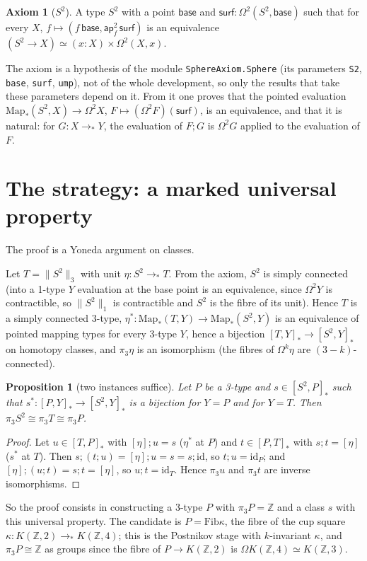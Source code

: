 \documentclass[11pt]{amsart}
\newtheorem{proposition}[theorem]{Proposition}
\theoremstyle{definition}
\newtheorem{axiom}[theorem]{Axiom}
\theoremstyle{remark}
\newcommand{\Om}{\Omega}
\newcommand{\Map}{\mathrm{Map}_*}
\newcommand{\Z}{\mathbb{Z}}
\newcommand{\code}[1]{\texttt{#1}}
\newcommand{\hc}[2]{[#1,#2]_*}
\newcommand{\Fib}{\mathrm{Fib}}
\newcommand{\tr}[1]{\|#1\|}
\newcommand{\cls}[1]{[#1]}
\begin{document}
\begin{axiom}[$S^2$]\label{a:s2}
A type $S^2$ with a point $\mathsf{base}$ and $\mathsf{surf}:\Om^2(S^2,\mathsf{base})$
such that for every $X$, $f\mapsto(f\,\mathsf{base},\mathsf{ap}^2_f\,\mathsf{surf})$ is
an equivalence $(S^2\to X)\simeq(x:X)\times\Om^2(X,x)$.
\end{axiom}

The axiom is a hypothesis of the module \code{SphereAxiom.Sphere} (its parameters
\code{S2}, \code{base}, \code{surf}, \code{ump}), not of the whole development, so only
the results that take these parameters depend on it. From it one proves that the
pointed evaluation $\Map(S^2,X)\to\Om^2X$, $F\mapsto(\Om^2F)(\mathsf{surf})$, is an
equivalence, and that it is natural: for $G:X\to_*Y$, the evaluation of $F;G$ is
$\Om^2G$ applied to the evaluation of $F$.

\section{The strategy: a marked universal property}

The proof is a Yoneda argument on classes.

Let $T=\tr{S^2}_3$ with unit $\eta:S^2\to_*T$. From the axiom, $S^2$ is simply
connected (into a 1-type $Y$ evaluation at the base point is an equivalence, since
$\Om^2Y$ is contractible, so $\tr{S^2}_1$ is contractible and $S^2$ is the fibre of its
unit). Hence $T$ is a simply connected 3-type, $\eta^*:\Map(T,Y)\to\Map(S^2,Y)$ is an
equivalence of pointed mapping types for every 3-type $Y$, hence a bijection
$\hc TY\to\hc{S^2}Y$ on homotopy classes, and $\pi_3\eta$ is an isomorphism (the fibres
of $\Om^k\eta$ are $(3-k)$-connected).

\begin{proposition}[two instances suffice]\label{p:two}
Let $P$ be a 3-type and $s\in\hc{S^2}P$ such that $s^*:\hc PY\to\hc{S^2}Y$ is a
bijection for $Y=P$ and for $Y=T$. Then $\pi_3S^2\cong\pi_3T\cong\pi_3P$.
\end{proposition}
\begin{proof}
Let $u\in\hc TP$ with $\cls\eta;u=s$ ($\eta^*$ at $P$) and $t\in\hc PT$ with
$s;t=\cls\eta$ ($s^*$ at $T$). Then $s;(t;u)=\cls\eta;u=s=s;\mathrm{id}$, so
$t;u=\mathrm{id}_P$; and $\cls\eta;(u;t)=s;t=\cls\eta$, so $u;t=\mathrm{id}_T$. Hence
$\pi_3u$ and $\pi_3t$ are inverse isomorphisms.
\end{proof}

So the proof consists in constructing a 3-type $P$ with $\pi_3P=\Z$ and a class $s$
with this universal property. The candidate is $P=\Fib\kappa$, the fibre of the cup
square $\kappa:K(\Z,2)\to_*K(\Z,4)$; this is the Postnikov stage with $k$-invariant
$\kappa$, and $\pi_3P\cong\Z$ as groups since the fibre of $P\to K(\Z,2)$ is
$\Om K(\Z,4)\simeq K(\Z,3)$.
\end{document}
